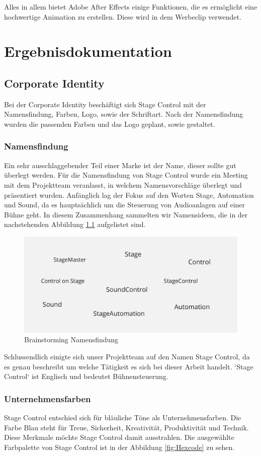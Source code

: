 Alles in allem bietet Adobe After Effects einige Funktionen, die es ermöglicht eine hochwertige Animation zu erstellen. Diese wird in dem Werbeclip verwendet. 

\chapter{Ergebnisdokumentation}

\section{Corporate Identity}
Bei der Corporate Identity beschäftigt sich Stage Control mit der Namensfindung, Farben, Logo, sowie der Schriftart. Nach der Namensfindung wurden die passenden Farben und das Logo geplant, sowie gestaltet.

\subsection{Namensfindung}
Ein sehr ausschlaggebender Teil einer Marke ist der Name, dieser sollte gut überlegt werden. Für die Namensfindung von Stage Control wurde ein Meeting mit dem Projektteam veranlasst, in welchem Namensvorschläge überlegt und präsentiert wurden. 
Anfänglich lag der Fokus auf den Worten Stage, Automation und Sound, da es hauptsächlich um die Steuerung von Audioanlagen auf einer Bühne geht. In diesem Zusammenhang sammelten wir Namensideen, die in der nachstehenden Abbildung \ref{fig:Brainstorming_Namensfindung} aufgelistet sind. 

\begin{figure}[H]
	\centering
	\includegraphics[width=0.5\linewidth]{images/Brainstorming_Namensfindung.png}
	\caption[Brainstorming Namensfindung]{Brainstorming Namensfindung}
	\label{fig:Brainstorming_Namensfindung}
\end{figure}

Schlussendlich einigte sich unser Projektteam auf den Namen Stage Control, da es genau beschreibt um welche Tätigkeit es sich bei dieser Arbeit handelt. ‘Stage Control‘ ist Englisch und bedeutet Bühnensteuerung. 

\subsection{Unternehmensfarben}
Stage Control entschied sich für bläuliche Töne als Unternehmensfarben. Die Farbe Blau steht für Treue, Sicherheit, Kreativität, Produktivität und Technik. \parencite{BedeutungderFarbeBlau} Diese Merkmale möchte Stage Control damit ausstrahlen. Die ausgewählte Farbpalette von Stage Control ist in der Abbildung \ref{fig:Hexcode} zu sehen. 

